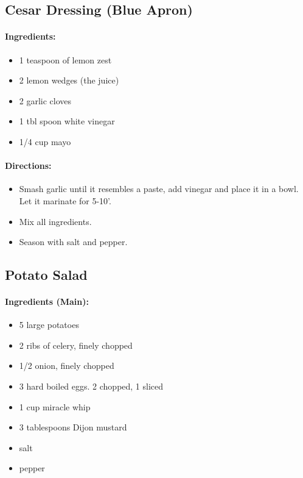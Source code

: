 \documentclass{article}
\begin{document}
\subsection{Cesar Dressing (Blue Apron)}

\paragraph{Ingredients:}

\begin{itemize}
	\item 1 teaspoon of lemon zest
	\item 2 lemon wedges (the juice)
	\item 2 garlic cloves
	\item 1 tbl spoon white vinegar
	\item 1/4 cup mayo
\end{itemize}

\paragraph{Directions:}
\begin{itemize}
	\item Smash garlic until it resembles a paste, add vinegar and place it in a bowl. Let it marinate for 5-10'. 
	\item Mix all ingredients.
	\item Season with salt and pepper.
\end{itemize}

\subsection{Potato Salad}

\paragraph{Ingredients (Main):}
\begin{itemize}
	\item 5 large potatoes 
	\item 2 ribs of celery, finely chopped 
	\item 1/2 onion, finely chopped 
	\item 3 hard boiled eggs. 2 chopped, 1 sliced 
	\item 1 cup miracle whip 
	\item 3 tablespoons Dijon mustard 
	\item salt 
	\item pepper
\end{itemize}
\end{document}
